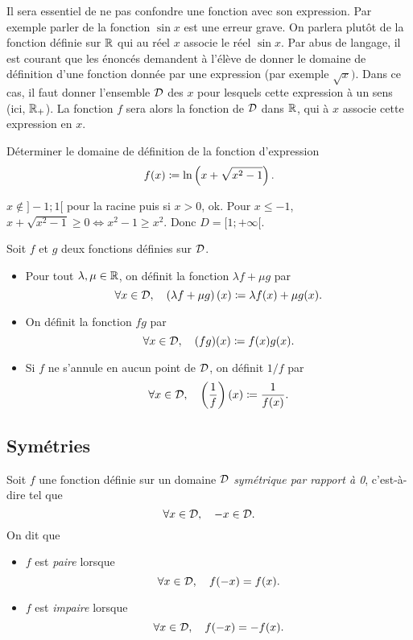 \documentclass{magnoliaold}
\begin{document}
\begin{remarques}
\remarque Il sera essentiel de ne pas confondre une fonction avec son
  expression.
  Par exemple parler de la fonction $\sin x$ est une erreur grave. On
  parlera plutôt de la fonction définie sur $\mathbb{R}$ qui au réel $x$ associe le
  réel $\sin x$.
\remarque Par abus de langage, il est courant que les énoncés demandent à
  l'élève de donner le domaine de définition d'une fonction donnée par une
  expression (par exemple $\sqrt{x})$. Dans ce cas, il faut donner l'ensemble
  $\mathcal{D}$ des $x$ pour lesquels cette expression à un sens (ici, $\mathbb{R}_+$). La
  fonction $f$ sera alors la fonction de
  $\mathcal{D}$ dans $\mathbb{R}$, qui à $x$ associe cette expression en $x$.
\end{remarques}

\begin{exoUnique}
\exo Déterminer le domaine de définition de la fonction d'expression
  \[f(x)\coloneqq\ln\left(x+\sqrt{x^2-1}\right).\]
\end{exoUnique}
\begin{sol}
$x\notin]-1;1[$ pour la racine puis si $x>0$, ok. Pour $x\leq -1$, $x+\sqrt{x^2-1}\geq 0 \Longleftrightarrow x^2-1\geq x^2$. Donc $D=[1;+\infty[$.
\end{sol}

\begin{definition}[utile=-3]
Soit $f$ et $g$ deux fonctions définies sur $\mathcal{D}$.
\begin{itemize}
\item Pour tout $\lambda,\mu\in\mathbb{R}$, on définit la fonction $\lambda f+\mu g$
  par
  \[\forall x\in\mathcal{D} ,\quad \left(\lambda f+\mu g\right)(x)\coloneqq
    \lambda f(x)+\mu g(x).\]
\item On définit la fonction $fg$ par
  \[\forall x\in\mathcal{D} ,\quad (fg)(x)\coloneqq f(x)g(x).\]
\item Si $f$ ne s'annule en aucun point de $\mathcal{D}$, on définit $1/f$ par
  \[\forall x\in\mathcal{D} ,\quad \left(\frac{1}{f}\right)(x)\coloneqq\frac{1}{f(x)}.\]
\end{itemize}
\end{definition}



\subsection{Symétries}
\begin{definition}[utile=-3]
  Soit $f$ une fonction définie sur un domaine $\mathcal{D}$ \emph{symétrique par rapport
  à 0}, c'est-à-dire tel que
\[\forall x\in\mathcal{D} ,\quad -x\in\mathcal{D}.\]
  On dit que
  \begin{itemize}
  \item $f$ est \emph{paire} lorsque
    $$\forall x\in\mathcal{D} ,\quad f(-x)=f(x).$$
  \item $f$ est \emph{impaire} lorsque
    $$\forall x\in\mathcal{D} ,\quad f(-x)=-f(x).$$
  \end{itemize}
\end{definition}
\end{document}
